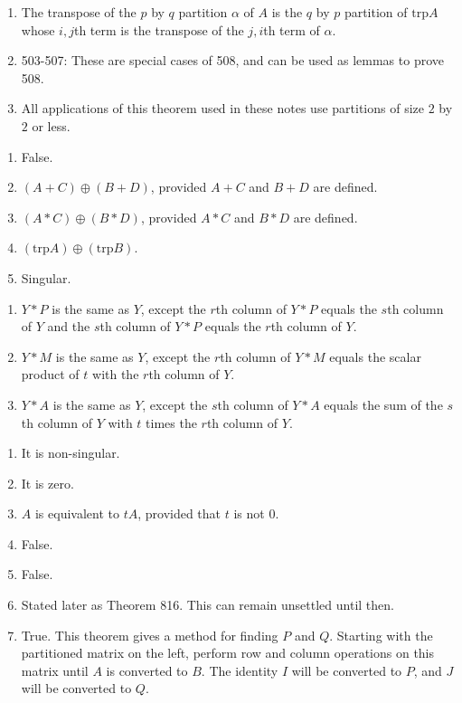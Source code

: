 \documentclass{article}
\begin{document}
\begin{enumerate}
  \item[502:] The transpose of the $p$ by $q$ partition $\alpha$ of $A$ is the $q$ by $p$ partition of $\text{trp} A$ whose $i,j$th term is the transpose of the $j,i$th term of $\alpha$.
  \item[] 503-507: These are special cases of 508, and can be used as lemmas to prove 508.
  \item[508:] All applications of this theorem used in these notes use partitions of size $2$ by $2$ or less.
\end{enumerate}
\vspace{0.5cm}

\begin{enumerate}
  \item[509:] False.
  \item[510:] $(A+C) \oplus (B+D)$, provided $A+C$ and $B+D$ are defined.
  \item[511:] $(A*C) \oplus (B*D)$, provided $A*C$ and $B*D$ are defined.
  \item[512:] $(\text{trp} A) \oplus (\text{trp} B)$.
  \item[515:] Singular.
\end{enumerate}
\vspace{0.5cm}

\begin{enumerate}
  \item[602:] $Y*P$ is the same as $Y$, except the $r$th column of $Y*P$ equals the $s$th column of $Y$ and the $s$th column of $Y*P$ equals the $r$th column of $Y$.
  \item[605:] $Y*M$ is the same as $Y$, except the $r$th column of $Y*M$ equals the scalar product of $t$ with the $r$th column of $Y$.
  \item[608:] $Y*A$ is the same as $Y$, except the $s$th column of $Y*A$ equals the sum of the $s$th column of $Y$ with $t$ times the $r$th column of $Y$.
\end{enumerate}
\vspace{0.5cm}

\begin{enumerate}
  \item[703:] It is non-singular.
  \item[704:] It is zero.
  \item[705:] $A$ is equivalent to $tA$, provided that $t$ is not $0$.
  \item[709:] False.
  \item[710:] False.
  \item[712:] Stated later as Theorem 816. This can remain unsettled until then.
  \item[715:] True. This theorem gives a method for finding $P$ and $Q$. Starting with the partitioned matrix on the left, perform row and column operations on this matrix until $A$ is converted to $B$. The identity $I$ will be converted to $P$, and $J$ will be converted to $Q$.
\end{enumerate}
\vspace{0.5cm}
\end{document}
